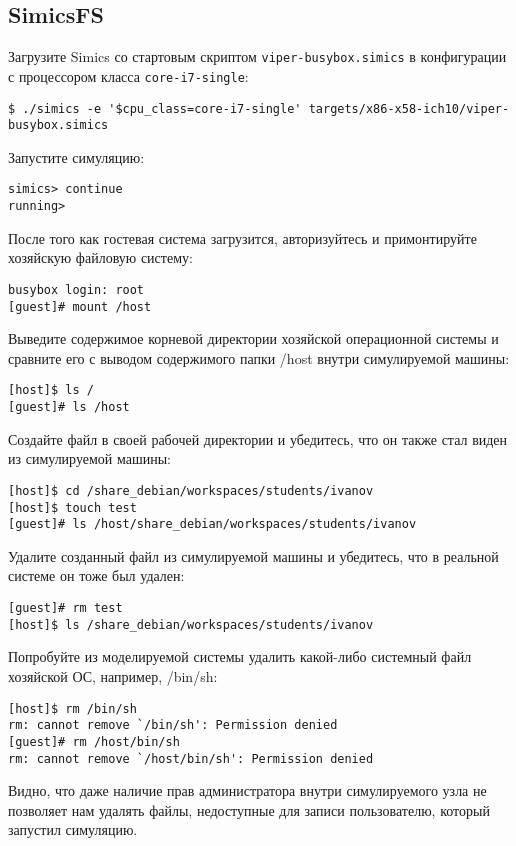 \subsection{SimicsFS}

\begin{enumerate*}

\item Загрузите Simics со стартовым скриптом \texttt{viper-busybox.simics} в конфигурации с процессором класса \texttt{core-i7-single}:
\begin{lstlisting}
$ ./simics -e '$cpu_class=core-i7-single' targets/x86-x58-ich10/viper-busybox.simics
\end{lstlisting}

\item Запустите симуляцию:
\begin{lstlisting}
simics> continue
running>
\end{lstlisting}

\item После того как гостевая система загрузится, авторизуйтесь и примонтируйте хозяйскую файловую систему:
\begin{lstlisting}
busybox login: root
[guest]# mount /host
\end{lstlisting}

\item Выведите содержимое корневой директории хозяйской операционной системы и сравните его с выводом содержимого папки /host внутри симулируемой машины:
\begin{lstlisting}
[host]$ ls /
[guest]# ls /host
\end{lstlisting}

\item Создайте файл в своей рабочей директории и убедитесь, что он также стал виден из симулируемой машины:
\begin{lstlisting}
[host]$ cd /share_debian/workspaces/students/ivanov
[host]$ touch test
[guest]# ls /host/share_debian/workspaces/students/ivanov
\end{lstlisting}

\item Удалите созданный файл из симулируемой машины и убедитесь, что в реальной системе он тоже был удален:
\begin{lstlisting}
[guest]# rm test
[host]$ ls /share_debian/workspaces/students/ivanov
\end{lstlisting}

\item Попробуйте из моделируемой системы удалить какой-либо системный файл хозяйской ОС, например, /bin/sh:
\begin{lstlisting}
[host]$ rm /bin/sh
rm: cannot remove `/bin/sh': Permission denied
[guest]# rm /host/bin/sh
rm: cannot remove `/host/bin/sh': Permission denied
\end{lstlisting}

Видно, что даже наличие прав администратора внутри симулируемого узла не позволяет нам удалять файлы, недоступные для записи пользователю, который запустил симуляцию.

\end{enumerate*}

